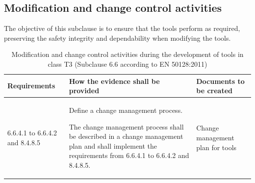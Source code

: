 \documentclass{template/openetcs_report}
\begin{document}
\subsection{Modification and change control activities}
\begin{flushleft}
The objective of this subclause is to ensure that the tools perform as required, preserving the safety integrity and dependability when modifying the tools.
\end{flushleft}
{\footnotesize\sffamily\centering
\begin{longtable}{|p{2cm}|p{9cm}|p{3cm}|}
\caption{Modification and change control activities during the development of tools in class T3 (Subclause 6.6 according to EN 50128:2011)}\\
\hline
\bfseries Requirements & \bfseries How the evidence shall be provided & \bfseries Documents to be created\\
\hline
\hline
\endhead
\hline
\endfoot

6.6.4.1 to 6.6.4.2 and 8.4.8.5 & Define a change management process.

The change management process shall be described in a  change management plan and shall implement the requirements from 6.6.4.1 to 6.6.4.2 and 8.4.8.5.
& Change management plan for tools\\ 
\hline
\end{longtable}}
\end{document}
